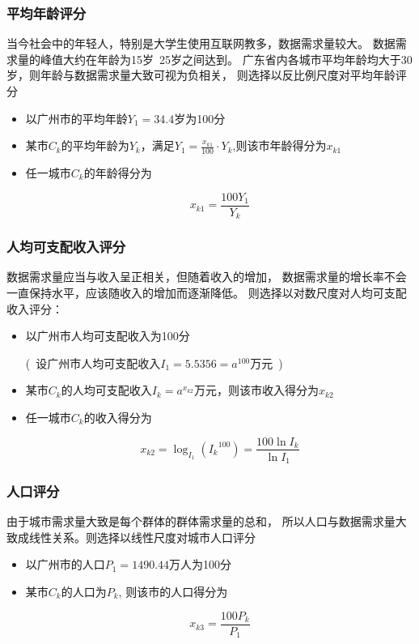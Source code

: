 \documentclass[UTF8,12pt]{ctexart}
\begin{document}
\subsubsection{平均年龄评分}
当今社会中的年轻人，特别是大学生使用互联网教多，数据需求量较大。
数据需求量的峰值大约在年龄为15岁~25岁之间达到。
广东省内各城市平均年龄均大于30岁，则年龄与数据需求量大致可视为负相关，
则选择以反比例尺度对平均年龄评分
\begin{itemize}
    \item 以广州市的平均年龄$Y_1=34.4$岁为100分
    \item 某市$C_k$的平均年龄为$Y_k$，满足$Y_1=\displaystyle\frac{x_{k1}}{100}·Y_k$,则该市年龄得分为$x_{k1}$
    \item 任一城市$C_k$的年龄得分为\begin{large}
              $$x_{k1}=\frac{100Y_1}{Y_k}$$
          \end{large}
\end{itemize}

\subsubsection{人均可支配收入评分}
数据需求量应当与收入呈正相关，但随着收入的增加，
数据需求量的增长率不会一直保持水平，应该随收入的增加而逐渐降低。
则选择以对数尺度对人均可支配收入评分：
\begin{itemize}
    \item 以广州市人均可支配收入为100分\par
          (\ 设广州市人均可支配收入$I_1=5.5356=a^{100}$万元\ )
    \item 某市$C_k$的人均可支配收入$I_k=a^{x_{k2}}$万元，则该市收入得分为$x_{k2}$
    \item 任一城市$C_k$的收入得分为\begin{large}
              $$x_{k2}=\log _{I_1}({I_k}^{100})=\frac{100\ln I_k}{\ln I_1}$$
          \end{large}
\end{itemize}

\subsubsection{人口评分}
由于城市需求量大致是每个群体的群体需求量的总和，
所以人口与数据需求量大致成线性关系。则选择以线性尺度对城市人口评分
\begin{itemize}
    \item 以广州市的人口$P_1=1490.44$万人为100分
    \item 某市$C_k$的人口为$P_k$,
          则该市的人口得分为\begin{large}
              $$x_{k3}=\frac{100P_k}{P_1}$$
          \end{large}
\end{itemize}
\end{document}
